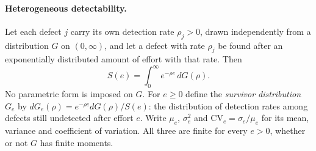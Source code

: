 

\paragraph{Heterogeneous detectability.}
Let each defect $j$ carry its own detection rate $\rho_j>0$, drawn independently
from a distribution $G$ on $(0,\infty)$, and let a defect with rate $\rho_j$ be found
after an exponentially distributed amount of effort with that rate. Then
\[
  S(e)=\int_0^\infty e^{-\rho e}\,dG(\rho).
\]
No parametric form is imposed on $G$. For $e\ge 0$ define the
\emph{survivor distribution} $G_e$ by
$dG_e(\rho)=e^{-\rho e}dG(\rho)/S(e)$: the distribution of detection rates
among defects still undetected after effort $e$. Write $\mu_e$, $\sigma_e^2$ and
$\mathrm{CV}_e=\sigma_e/\mu_e$ for its mean, variance and coefficient of variation.
All three are finite for every $e>0$, whether or not $G$ has finite moments.

